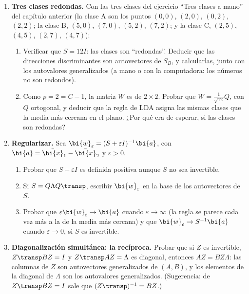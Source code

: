 \begin{enumerate}[leftmargin=*,label=\textbf{\thechapter.\arabic*},ref=\thechapter.\arabic*,itemsep=4pt]
\item {} \textbf{Tres clases redondas.}\label{lda-ej:tres} Con las
tres clases del ejercicio ``Tres clases a mano'' del capítulo anterior (la
clase A son los puntos $(0,0)$, $(2,0)$, $(0,2)$, $(2,2)$; la clase B,
$(5,0)$, $(7,0)$, $(5,2)$, $(7,2)$; y la clase C, $(2,5)$, $(4,5)$, $(2,7)$,
$(4,7)$):
\begin{enumerate}[label=(\alph*)]
\item Verificar que $S=12I$: las clases son ``redondas''. Deducir que las
direcciones discriminantes son autovectores de $S_B$, y calcularlas, junto con
los autovalores generalizados (a mano o con la computadora: los números no son
redondos).
\item Como $p=2=C-1$, la matriz $W$ es de $2\times2$. Probar que
$W=\frac1{\sqrt{12}}Q$, con $Q$ ortogonal, y deducir que la regla de LDA
asigna las mismas clases que la media más cercana en el plano. ¿Por qué era de
esperar, si las clases son redondas?
\end{enumerate}

\item {} \textbf{Regularizar.}\label{lda-ej:regularizar} Sea
$\bi{w}_\varepsilon=(S+\varepsilon I)^{-1}\bi{a}$, con $\bi{a}=\bar{\bi{x}}_1-\bar{\bi{x}}_2$ y
$\varepsilon>0$.
\begin{enumerate}[label=(\alph*)]
\item Probar que $S+\varepsilon I$ es definida positiva aunque $S$ no sea
invertible.
\item Si $S=Q\Lambda Q\transp$, escribir $\bi{w}_\varepsilon$ en la base de los
autovectores de $S$.
\item Probar que $\varepsilon \bi{w}_\varepsilon\to \bi{a}$ cuando
$\varepsilon\to\infty$ (la regla se parece cada vez más a la de la media más
cercana) y que $\bi{w}_\varepsilon\to S^{-1}\bi{a}$ cuando $\varepsilon\to0$, si $S$
es invertible.
\end{enumerate}

\item {} \textbf{Diagonalización simultánea: la
recíproca.}\label{lda-ej:simultanea} Probar que si $Z$ es invertible,
$Z\transp BZ=I$ y $Z\transp AZ=\Lambda$ es diagonal, entonces $AZ=BZ\Lambda$: las
columnas de $Z$ son autovectores generalizados de $(A,B)$, y los elementos de
la diagonal de $\Lambda$ son los autovalores generalizados. (Sugerencia: de
$Z\transp BZ=I$ sale que $(Z\transp)^{-1}=BZ$.)


\end{enumerate}
